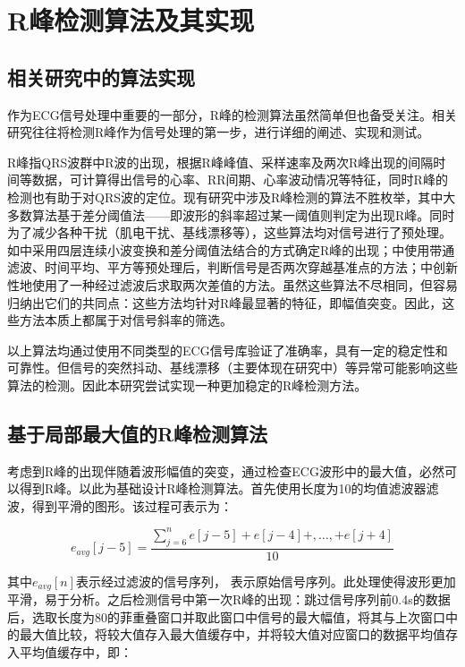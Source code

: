 \setcounter{figure}{0}
\setcounter{table}{0}
\section{R峰检测算法及其实现}
\subsection{相关研究中的算法实现}
作为ECG信号处理中重要的一部分，R峰的检测算法虽然简单但也备受关注。相关研究往往将检测R峰作为信号处理的第一步，进行详细的阐述、实现和测试。

R峰指QRS波群中R波的出现，根据R峰峰值、采样速率及两次R峰出现的间隔时间等数据，可计算得出信号的心率、RR间期、心率波动情况等特征，同时R峰的检测也有助于对QRS波的定位。现有研究中涉及R峰检测的算法不胜枚举，其中大多数算法基于差分阈值法——即波形的斜率超过某一阈值则判定为出现R峰。同时为了减少各种干扰（肌电干扰、基线漂移等），这些算法均对信号进行了预处理。如\cite{_4.0android_2013}中采用四层连续小波变换和差分阈值法结合的方式确定R峰的出现；\cite{clifford_signal_2002}中使用带通滤波、时间平均、平方等预处理后，判断信号是否两次穿越基准点的方法；\cite{sadhukhan_r-peak_2012}中创新性地使用了一种经过滤波后求取两次差值的方法。虽然这些算法不尽相同，但容易归纳出它们的共同点：这些方法均针对R峰最显著的特征，即幅值突变。因此，这些方法本质上都属于对信号斜率的筛选。

以上算法均通过使用不同类型的ECG信号库验证了准确率，具有一定的稳定性和可靠性。但信号的突然抖动、基线漂移（主要体现在研究\cite{clifford_signal_2002}中）等异常可能影响这些算法的检测。因此本研究尝试实现一种更加稳定的R峰检测方法。

\subsection{基于局部最大值的R峰检测算法}

考虑到R峰的出现伴随着波形幅值的突变，通过检查ECG波形中的最大值，必然可以得到R峰。以此为基础设计R峰检测算法。首先使用长度为10的均值滤波器滤波，得到平滑的图形。该过程可表示为：

\begin{equation}
  {{e}_{avg}}[j-5]=\frac{\sum\limits_{j=6}^{n}{e[j-5]+e[j-4]+,\ldots ,+e[j+4]}}{10}
  \label{equ1}
\end{equation}

其中${{e}_{avg}}[n]$表示经过滤波的信号序列， 表示原始信号序列。此处理使得波形更加平滑，易于分析。之后检测信号中第一次R峰的出现：跳过信号序列前0.4s的数据后，选取长度为80的菲重叠窗口并取此窗口中信号的最大幅值，将其与上次窗口中的最大值比较，将较大值存入最大值缓存中，并将较大值对应窗口的数据平均值存入平均值缓存中，即：

